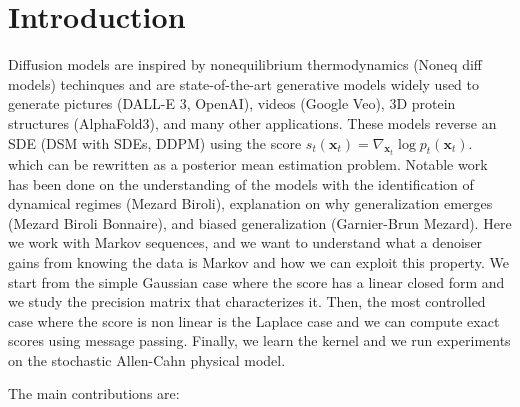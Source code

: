 \section{Introduction}
\label{sec:intro}




Diffusion models are inspired by nonequilibrium thermodynamics (Noneq diff models) techinques and are state-of-the-art generative models widely used to generate pictures (DALL-E 3, OpenAI), videos (Google Veo), 3D protein structures (AlphaFold3), and many other applications. These models reverse an SDE (DSM with SDEs, DDPM) using the score $s_t(\mathbf{x}_t)
=
\nabla_{\mathbf{x}_t}
\log p_t(\mathbf{x}_t).$ which can be rewritten as a posterior mean estimation problem. Notable work has been done on the understanding of the models with the identification of dynamical regimes (Mezard Biroli), explanation on why generalization emerges (Mezard Biroli Bonnaire), and biased generalization (Garnier-Brun Mezard). 
Here we work with Markov sequences, and we want to understand what a denoiser gains from knowing the data is Markov and how we can exploit this property.
We start from the simple Gaussian case where the score has a linear closed form and we study the precision matrix that characterizes it. Then, the most controlled case where the score is non linear is the Laplace case and we can compute exact scores using message passing. Finally, we learn the kernel and we run experiments on the stochastic Allen-Cahn physical model.

The main contributions are:

